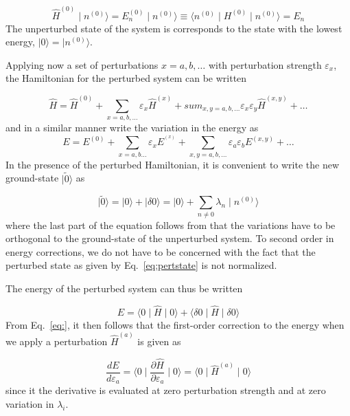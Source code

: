 \documentclass[%
 reprint,
 amsmath,amssymb,
 aps,
]{revtex4-1}
\begin{document}
\begin{equation}
\hat{H}^{(0)}\mid n^{(0)}\rangle = E_n^{(0)}\mid n^{(0)}\rangle\equiv
\langle n^{(0)}\mid H^{(0)}\mid n^{(0)}\rangle = E_n
\end{equation}
The unperturbed state of the system is corresponds to the state with
the lowest energy, $\mid 0\rangle = \mid n^{(0)}\rangle$.

Applying now a set of perturbations $x=a,b,\ldots$ with perturbation strength
$\varepsilon_x$, the Hamiltonian for the perturbed system can be written

\begin{equation}
\hat{H} = \hat{H}^{(0)} +
\sum_{x=a,b,\ldots}\varepsilon_x\hat{H}^{(x)} +
sum_{x,y=a,b,\ldots}\varepsilon_x\varepsilon_y\hat{H}^{(x,y)}+\ldots
\end{equation}
and in a similar manner write the variation in the energy as
\begin{equation}
E = E^{(0)} + \sum_{x=a,b\ldots}\varepsilon_xE^{^(x)} +
\sum_{x,y=a,b,\ldots}\varepsilon_a\varepsilon_bE^{(x,y)} + \ldots\label{eq:Eexpansion}
\end{equation}
In the presence of the perturbed Hamiltonian, it is convenient to
write the new ground-state $\mid\tilde{0}\rangle$ as

\begin{equation}
\mid\tilde{0}\rangle = \mid 0\rangle + \mid \delta 0\rangle = \mid
0\rangle +\sum_{n\not =0}\lambda_n\mid n^{(0)}\rangle\label{eq:pertstate}
\end{equation}
where the last part of the equation follows from that the variations
have to be orthogonal to the ground-state of the unperturbed
system. To second order in energy corrections, we do not have to be concerned with the fact
that the perturbed state as given by Eq.~\eqref{eq:pertstate} is not
normalized. 

The energy of the perturbed system can thus be written

\begin{equation}
E = \langle 0\mid \hat{H}\mid 0\rangle + \langle\delta 0\mid
\hat{H}\mid \delta 0\rangle
\end{equation}
From Eq.~\eqref{eq:}, it then follows that the first-order correction
to the energy when we apply a perturbation $\hat{H}^{(a)}$ is given as

\begin{equation}
\frac{dE}{d\varepsilon_a} = \langle
0\mid\frac{\partial\hat{H}}{\partial\varepsilon_a}\mid 0\rangle =
\langle 0\mid \hat{H}^{(a)}\mid 0\rangle
\end{equation}
since it the derivative is evaluated at zero perturbation strength and
at zero variation in $\lambda_i$.
\end{document}
